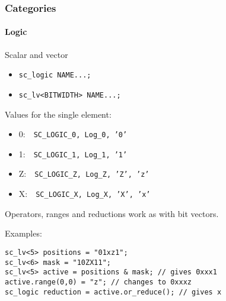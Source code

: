 \begin{frame}[fragile]
\frametitle{Categories}
\framesubtitle{Logic}

{\scriptsize 
\begin{block}{Scalar and vector}
\begin{itemize}
\item \texttt{sc\_logic NAME...;}
\item \texttt{sc\_lv<BITWIDTH> NAME...;}
\end{itemize}
Values for the single element:
\begin{itemize}
\item 0: \,\, \texttt{SC\_LOGIC\_0, Log\_0, '0'}
\item 1: \,\, \texttt{SC\_LOGIC\_1, Log\_1, '1'}
\item Z: \,\, \texttt{SC\_LOGIC\_Z, Log\_Z, 'Z', 'z'}
\item X: \,\, \texttt{SC\_LOGIC\_X, Log\_X, 'X', 'x'}
\end{itemize}
Operators, ranges and reductions work as with bit vectors.
\end{block}
\pause
\begin{block}{Examples:} 
\vspace{-1em}
\begin{verbatim}
sc_lv<5> positions = "01xz1";
sc_lv<6> mask = "10ZX11";
sc_lv<5> active = positions & mask; // gives 0xxx1
active.range(0,0) = "z"; // changes to 0xxxz
sc_logic reduction = active.or_reduce(); // gives x
\end{verbatim}
\vspace{-1em}
\end{block}
}
\end{frame}

